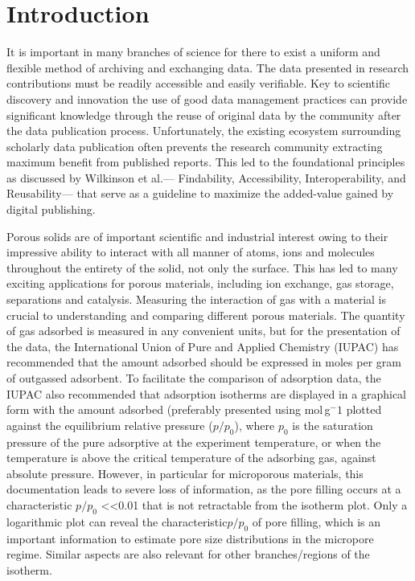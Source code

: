 \documentclass[journal=langd5,manuscript=article]{achemso}
\begin{document}
\section{Introduction}
It is important in many branches of science for there to exist a uniform and flexible method of archiving and exchanging data.
The data presented in research contributions must be readily accessible and easily verifiable.
Key to scientific discovery and innovation the use of good data management practices can  provide significant knowledge through the reuse of original data by the community after the data publication process.\cite{10.1002/adts.201900131}
Unfortunately, the existing ecosystem surrounding scholarly data publication often prevents the research community extracting maximum benefit from published reports.
This led to the foundational principles as discussed by Wilkinson et al.--- Findability, Accessibility, Interoperability, and Reusability--- that serve as a guideline to maximize the added-value gained by digital publishing.\cite{10.1038/sdata.2016.18}

Porous solids are of important scientific and industrial interest owing to their impressive ability to interact with all manner of atoms, ions and molecules throughout the entirety of the solid, not only the surface.\cite{10.1038/nature00785}
This has led to many exciting applications for porous materials, including ion exchange, gas storage, separations and catalysis.\cite{10.1039/C6CS00135A}
Measuring the interaction of gas with a material is crucial to understanding and comparing different porous materials.
The quantity of gas adsorbed is measured in any convenient units, but for the presentation of the data, the International Union of Pure and Applied Chemistry (IUPAC) has recommended that the amount adsorbed should be expressed in moles per gram of outgassed adsorbent.\cite{10.1515/pac-2014-1117}
To facilitate the comparison of adsorption data, the IUPAC also recommended that adsorption isotherms are displayed in a graphical form with the amount adsorbed (preferably presented using mol$\,$g$^-1$ plotted against the equilibrium relative pressure ($p/p_0$), where $p_0$ is the saturation pressure of the pure adsorptive at the experiment temperature, or when the temperature is above the critical temperature of the adsorbing gas, against absolute pressure.
However, in particular for microporous materials, this documentation leads to severe loss of information, as the pore filling occurs at a characteristic $p/p_0$ \textless\textless 0.01 that is not retractable from the isotherm plot.
Only a logarithmic plot can reveal the characteristic$ p/p_0$ of pore filling, which is an important information to estimate pore size distributions in the micropore regime.
Similar aspects are also relevant for other branches/regions of the isotherm. 
\end{document}
